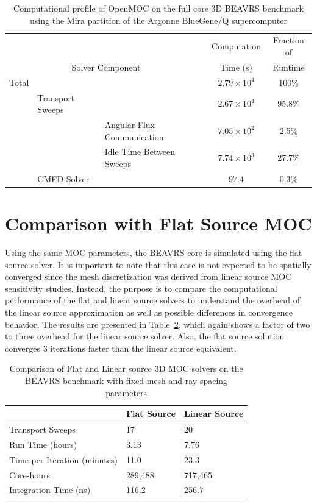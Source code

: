 \begin{table}[ht]
	\centering
	\caption{Computational profile of OpenMOC on the full core 3D BEAVRS benchmark using the Mira partition of the Argonne BlueGene/Q supercomputer}
	\medskip
	\begin{tabular}{lll|c|c}
		\hline
		& & & Computation & Fraction of \\
		\multicolumn{3}{c|}{Solver Component} & Time (s) & Runtime\\
		\hline
		Total & & & $2.79 \times 10^4$ & 100\% \\
		& Transport Sweeps & & $2.67 \times 10^4$ & 95.8\% \\
		& & Angular Flux Communication & $7.05 \times 10^2$ & 2.5\% \\
		& & Idle Time Between Sweeps & $7.74 \times 10^3$ & 27.7\% \\
		& CMFD Solver & & $97.4$ & 0.3\% \\		
		\hline
	\end{tabular}
	\label{tab:full-core-comp-prof}
\end{table}


\section{Comparison with Flat Source MOC}
\label{sec:fc-flat-source}

Using the same \ac{MOC} parameters, the BEAVRS core is simulated using the flat source solver. It is important to note that this case is not expected to be spatially converged since the mesh discretization was derived from linear source \ac{MOC} sensitivity studies. Instead, the purpose is to compare the computational performance of the flat and linear source solvers to understand the overhead of the linear source approximation as well as possible differences in convergence behavior. The results are presented in Table~\ref{tab:fc-comp-flat-linear}, which again shows a factor of two to three overhead for the linear source solver. Also, the flat source solution converges 3 iterations faster than the linear source equivalent. 

\begin{table}[ht]
	\centering
	\caption{Comparison of Flat and Linear source 3D \ac{MOC} solvers on the BEAVRS benchmark with fixed mesh and ray spacing parameters}
	\medskip
	\begin{tabular}{l|l|l}
		\hline
		 & Flat Source & Linear Source \\
		\hline
		Transport Sweeps & 17 & 20 \\
		Run Time (hours) & 3.13 & 7.76 \\
		Time per Iteration (minutes) & 11.0 & 23.3 \\
		Core-hours & 289,488 & 717,465 \\
		Integration Time (ns) & 116.2 & 256.7 \\
		\hline
	\end{tabular}
	\label{tab:fc-comp-flat-linear}
\end{table}

